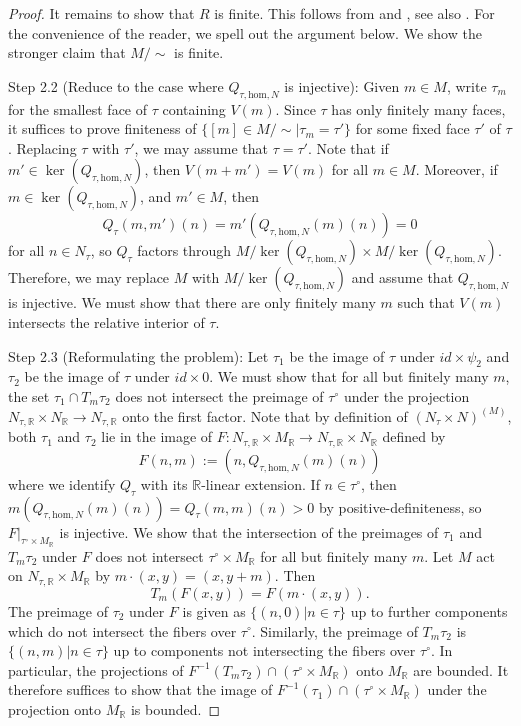 \documentclass[11pt]{amsart}
\theoremstyle{definition}
\theoremstyle{remark}
\def\hom{\mathrm{hom}}
\begin{document}
\begin{proof}
	It remains to show that $R$ is finite. This follows from
	\cite[Lemma 7.12 (2)]{LogarithmicAbeKajiwa2008} and \cite[5.2.7]{LogarithmicAbeKajiwa2015},
	see also \cite[9.4]{LogarithmicAbeKajiwa2008}. For the convenience
	of the reader, we spell out the argument below. We show the
	stronger claim that $M/{\sim}$ is finite.

	Step 2.2 (Reduce to the case where $Q_{\tau,\hom,N}$ is injective): Given
	$m\in M$, write $\tau_m$ for the smallest face of $\tau$ containing
	$V(m)$. Since $\tau$ has only finitely many faces, it suffices
	to prove finiteness of $\{[m]\in M/\sim|\tau_m=\tau'\}$ for some fixed
	face $\tau'$ of $\tau$. Replacing $\tau$ with $\tau'$, we
	may assume that $\tau=\tau'$. Note that if $m'\in \ker(Q_{\tau,\hom,N})$,
	then $V(m+m')=V(m)$ for all $m\in M$. Moreover, if $m\in \ker(Q_{\tau,\hom,N})$,
	and $m'\in M$, then
	$$Q_{\tau}(m,m')(n)=m'(Q_{\tau,\hom,N}(m)(n))=0$$
	for all
	$n\in N_{\tau}$, so $Q_{\tau}$ factors through $M/\ker(Q_{\tau,\hom,N})\times M/\ker(Q_{\tau,\hom,N})$.
	Therefore, we may replace
	$M$ with $M/\ker(Q_{\tau,\hom,N})$ and assume that $Q_{\tau,\hom,N}$
	is injective. We must show that there are only finitely many
	$m$ such that $V(m)$ intersects the relative interior of
	$\tau$.

	Step 2.3 (Reformulating the problem): Let $\tau_1$ be the image of $\tau$
	under $id\times \psi_2$ and $\tau_2$ be the image of
	$\tau$ under $id\times 0$. We must show that
	for all but finitely many $m$, the set $\tau_1\cap T_m\tau_2$
	does not intersect the preimage of $\tau^{\circ}$ under the
	projection $N_{\tau,\mathbb{R}}\times N_{\mathbb{R}}\to N_{\tau,\mathbb{R}}$ onto the first factor.
	Note that by definition of $(N_{\tau}\times N)^{(M)}$, both
	$\tau_1$ and $\tau_2$ lie in the image of
	$F:N_{\tau,\mathbb{R}}\times M_{\mathbb{R}}\to N_{\tau,\mathbb{R}}\times N_{\mathbb{R}}$
	defined by
	$$F(n,m):=(n,Q_{\tau,\hom,N}(m)(n))$$
	where we identify $Q_{\tau}$ with its $\mathbb{R}$-linear extension. If
	$n\in \tau^{\circ}$, then $m(Q_{\tau,\hom,N}(m)(n))=Q_{\tau}(m,m)(n)>0$
	by positive-definiteness, so $F|_{\tau^{\circ}\times M_{\mathbb{R}}}$
	is injective. We show that the intersection of the preimages of $\tau_1$ and $T_m\tau_2$ under
	$F$ does not intersect $\tau^{\circ}\times M_{\mathbb{R}}$ for all but finitely many $m$.
	Let $M$ act on $N_{\tau,\mathbb{R}}\times M_{\mathbb{R}}$
	by $m\cdot (x,y)=(x,y+m)$. Then
	$$T_m(F(x,y))=F(m\cdot (x,y)).$$
	The preimage of $\tau_2$ under $F$ is given as $\{(n,0)|n\in \tau\}$ up to further components which do not intersect the fibers over $\tau^{\circ}$.
	Similarly, the preimage of $T_m\tau_2$ is $\{(n,m)|n\in \tau\}$ up to components not intersecting the fibers over $\tau^{\circ}$.
	In particular, the projections of $F^{-1}(T_m \tau_2)\cap (\tau^{\circ}\times M_{\mathbb{R}})$ onto $M_{\mathbb{R}}$
	are bounded. It therefore suffices to show that the image of $F^{-1}(\tau_1)\cap (\tau^{\circ}\times M_{\mathbb{R}})$
	under the projection onto $M_{\mathbb{R}}$ is bounded.


\end{proof}
\end{document}
